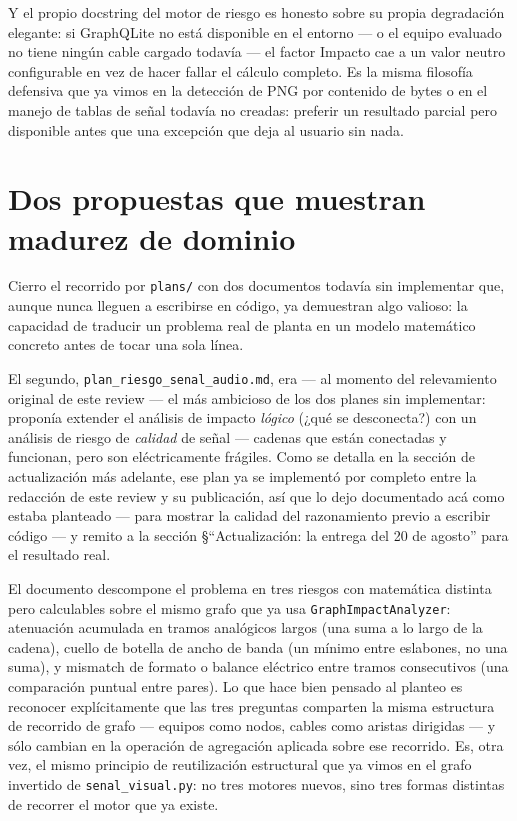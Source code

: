 \documentclass[11pt,twocolumn]{article}
\begin{document}
Y el propio docstring del motor de riesgo es honesto sobre su propia degradación elegante: si GraphQLite no está disponible en el entorno --- o el equipo evaluado no tiene ningún cable cargado todavía --- el factor Impacto cae a un valor neutro configurable en vez de hacer fallar el cálculo completo. Es la misma filosofía defensiva que ya vimos en la detección de PNG por contenido de bytes o en el manejo de tablas de señal todavía no creadas: preferir un resultado parcial pero disponible antes que una excepción que deja al usuario sin nada.

\section{Dos propuestas que muestran madurez de dominio}

Cierro el recorrido por \texttt{plans/} con dos documentos todavía sin implementar que, aunque nunca lleguen a escribirse en código, ya demuestran algo valioso: la capacidad de traducir un problema real de planta en un modelo matemático concreto antes de tocar una sola línea.

El segundo, \texttt{plan\_riesgo\_senal\_audio.md}, era --- al momento del relevamiento original de este review --- el más ambicioso de los dos planes sin implementar: proponía extender el análisis de impacto \emph{lógico} (¿qué se desconecta?) con un análisis de riesgo de \emph{calidad} de señal --- cadenas que están conectadas y funcionan, pero son eléctricamente frágiles. Como se detalla en la sección de actualización más adelante, ese plan ya se implementó por completo entre la redacción de este review y su publicación, así que lo dejo documentado acá como estaba planteado --- para mostrar la calidad del razonamiento previo a escribir código --- y remito a la sección \S{}``Actualización: la entrega del 20 de agosto'' para el resultado real.

El documento descompone el problema en tres riesgos con matemática distinta pero calculables sobre el mismo grafo que ya usa \texttt{GraphImpactAnalyzer}: atenuación acumulada en tramos analógicos largos (una suma a lo largo de la cadena), cuello de botella de ancho de banda (un mínimo entre eslabones, no una suma), y mismatch de formato o balance eléctrico entre tramos consecutivos (una comparación puntual entre pares). Lo que hace bien pensado al planteo es reconocer explícitamente que las tres preguntas comparten la misma estructura de recorrido de grafo --- equipos como nodos, cables como aristas dirigidas --- y sólo cambian en la operación de agregación aplicada sobre ese recorrido. Es, otra vez, el mismo principio de reutilización estructural que ya vimos en el grafo invertido de \texttt{senal\_visual.py}: no tres motores nuevos, sino tres formas distintas de recorrer el motor que ya existe.
\end{document}
